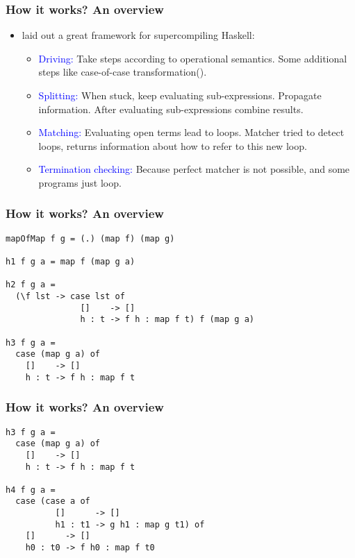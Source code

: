 \documentclass{beamer}
\begin{document}
\begin{frame}
    \frametitle{How it works? An overview}

    \begin{itemize}
        \item[]
            \citet{callbyneed-sc} laid out a great framework for
            supercompiling Haskell:
            \begin{itemize}[<+->]
                \item
                    \textcolor{blue}{Driving:} Take steps according to operational
                    semantics.  Some additional steps like case-of-case
                    transformation(\citet{Jones98atransformation-based}).
                \item
                    \textcolor{blue}{Splitting:} When stuck, keep evaluating
                    sub-expressions. Propagate information. After evaluating
                    sub-expressions combine results.
                \item
                    \textcolor{blue}{Matching:} Evaluating open terms lead to loops.
                    Matcher tried to detect loops, returns information about how to
                    refer to this new loop.
                \item
                    \textcolor{blue}{Termination checking:} Because perfect matcher is
                    not possible, and some programs just loop.
            \end{itemize}
    \end{itemize}
\end{frame}

\begin{frame}[fragile]
    \frametitle{How it works? An overview}
    \begin{verbatim}
mapOfMap f g = (.) (map f) (map g)

h1 f g a = map f (map g a)

h2 f g a =
  (\f lst -> case lst of
               []    -> []
               h : t -> f h : map f t) f (map g a)

h3 f g a =
  case (map g a) of
    []    -> []
    h : t -> f h : map f t
    \end{verbatim}
\end{frame}

\begin{frame}[fragile]
    \frametitle{How it works? An overview}
    \begin{verbatim}
h3 f g a =
  case (map g a) of
    []    -> []
    h : t -> f h : map f t

h4 f g a =
  case (case a of
          []      -> []
          h1 : t1 -> g h1 : map g t1) of
    []      -> []
    h0 : t0 -> f h0 : map f t0
    \end{verbatim}
\end{frame}
\end{document}
